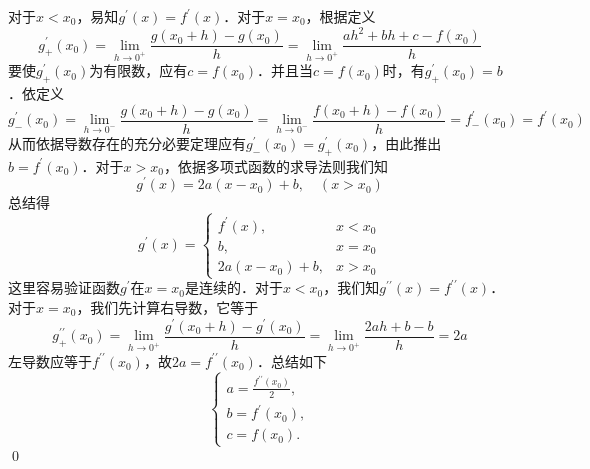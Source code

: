 \solve 对于$x < x_0$，易知$g^{\prime}(x)=f^{\prime}(x)$．对于$x=x_0$，根据定义
\begin{equation}
    g^{\prime}_{+}(x_0) = \lim_{h \to 0^+} \frac{g(x_0+h)-g(x_0)}{h} = \lim_{h \to 0^+} \frac{ah^2+bh+c-f(x_0)}{h}
\end{equation}
要使$g^{\prime}_{+}(x_0)$为有限数，应有$c=f(x_0)$．并且当$c=f(x_0)$时，有$g^{\prime}_{+}(x_0)=b$．依定义
\begin{equation}
    g^{\prime}_{-}(x_0) = \lim_{h \to 0^-} \frac{g(x_0+h)-g(x_0)}{h} = \lim_{h \to 0^-} \frac{f(x_0+h)-f(x_0)}{h} = f^{\prime}_{-}(x_0) = f^{\prime}(x_0)
\end{equation}
从而依据导数存在的充分必要定理应有$g^{\prime}_{-}(x_0)=g^{\prime}_{+}(x_0)$，由此推出$b=f^{\prime}(x_0)$．对于$x > x_0$，依据多项式函数的求导法则我们知
\begin{equation}
    g^{\prime}(x) = 2a(x-x_0)+b, \quad (x > x_0)
\end{equation}
总结得
\begin{equation}
    g^{\prime}(x) = \begin{cases}
        f^{\prime}(x), & x < x_0 \\
        b, & x = x_0 \\
        2a(x-x_0)+b, & x > x_0
    \end{cases}
\end{equation}
这里容易验证函数$g^{\prime}$在$x=x_0$是连续的．对于$x < x_0$，我们知$g^{\prime\prime}(x) = f^{\prime\prime}(x)$．对于$x=x_0$，我们先计算右导数，它等于
\begin{equation}
    g^{\prime\prime}_{+}(x_0) = \lim_{h \to 0^+} \frac{g^{\prime}(x_0+h)-g^{\prime}(x_0)}{h} = \lim_{h \to 0^+} \frac{2ah+b-b}{h} = 2a
\end{equation}
左导数应等于$f^{\prime\prime}(x_0)$，故$2a = f^{\prime\prime}(x_0)$．总结如下
\begin{equation}
    \begin{cases}
        a = \displaystyle\frac{f^{\prime\prime}(x_0)}{2}, \\
        b = f^{\prime}(x_0), \\
        c = f(x_0).
    \end{cases}
\end{equation}
\qed\bigskip